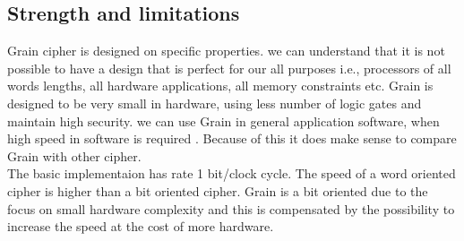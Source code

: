 \subsection{Strength and limitations}
Grain cipher is designed on specific properties. we can understand that it is not possible to have a design that is perfect for our all purposes i.e., processors of all words lengths, all hardware applications, all memory constraints etc. Grain is designed to be very small in hardware, using less number of logic gates and maintain high security. we can use Grain in general application software, when high speed in software is required . Because of this it does make sense to compare Grain with other cipher. \\

The basic implementaion has rate 1 bit/clock cycle. The speed of a word oriented cipher is higher than a bit oriented cipher. Grain is a bit oriented due to the focus on small hardware complexity and this is compensated by the possibility to increase the speed at the cost of more hardware.

